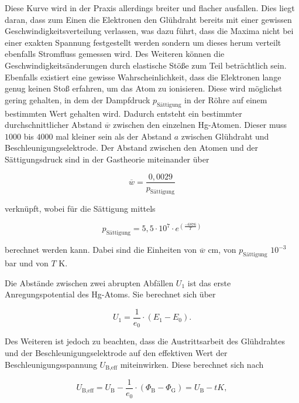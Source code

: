 Diese Kurve wird in der Praxis allerdings breiter und flacher ausfallen.
Dies liegt daran, dass zum Einen die Elektronen den Glühdraht bereits mit einer gewissen Geschwindigkeitsverteilung verlassen, was dazu führt, dass die Maxima nicht bei einer exakten Spannung festgestellt werden sondern um dieses herum verteilt ebenfalls Stromfluss gemessen wird.
Des Weiteren können die Geschwindigkeitsänderungen durch elastische Stöße zum Teil beträchtlich sein.
Ebenfalls existiert eine gewisse Wahrscheinlichkeit, dass die Elektronen lange genug keinen Stoß erfahren, um das Atom zu ionisieren.
Diese wird möglichst gering gehalten, in dem der Dampfdruck $p_\text{Sättigung}$ in der Röhre auf einem bestimmten Wert gehalten wird. Dadurch entsteht ein bestimmter durchschnittlicher Abstand $\overline{w}$ zwischen den einzelnen Hg-Atomen.
Dieser muss $1000$ bis $4000$ mal kleiner sein als der Abstand $a$ zwischen Glühdraht und Beschleunigungselektrode. Der Abstand zwischen den Atomen und der Sättigungsdruck sind in der Gastheorie miteinander über

\begin{equation}
    \label{eqn:druck-abstand}
    \overline{w} = \frac{0,0029}{p_\text{Sättigung}}
\end{equation}

verknüpft, wobei für die Sättigung mittels

\begin{equation}
    \label{eqn:saettigung}
    p_\text{Sättigung} = 5,5 \cdot 10^7 \cdot e^(\frac{-6876}{T})
\end{equation}

berechnet werden kann. Dabei sind die Einheiten von $\overline{w}$ cm, von $p_\text{Sättigung}$ $10^{-3}$ bar und von $T$ K.


Die Abstände zwischen zwei abrupten Abfällen $U_1$ ist das erste Anregungspotential des Hg-Atoms. Sie berechnet sich über

\begin{equation}
    \label{eqn:anregungspotential}
    U_1 = \frac{1}{e_0} \cdot (E_1 - E_0).
\end{equation}

Des Weiteren ist jedoch zu beachten, dass die Austrittsarbeit des Glühdrahtes und der Beschleunigungselektrode auf den effektiven Wert der Beschleunigungsspannung $U_\text{B,eff}$ miteinwirken.
Diese berechnet sich nach

\begin{equation}
    \label{eqn:accl-eff}
    U_\text{B,eff} = U_\text{B} - \frac{1}{e_0} \cdot (\Phi_\text{B} - \Phi_\text{G}) = U_\text{B} -t K,
\end{equation}

